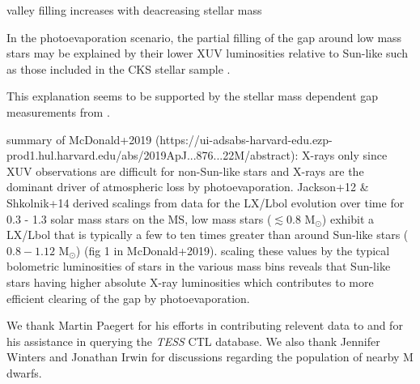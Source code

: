 \documentclass[twocolumn]{emulateapj}
\newcommand{\tess}[1]{\emph{TESS}#1}
\begin{document}
valley filling increases with deacreasing stellar mass  

In the photoevaporation scenario, the
partial filling of the gap around low mass stars may be explained by their lower XUV luminosities relative to 
Sun-like such as those included in the CKS stellar sample \citep{}.

This explanation seems to be supported by the stellar mass dependent gap measurements from \cite{fulton18}. 

summary of McDonald+2019 (https://ui-adsabs-harvard-edu.ezp-prod1.hul.harvard.edu/abs/2019ApJ...876...22M/abstract):
X-rays only since XUV observations are difficult for non-Sun-like stars and X-rays are the dominant driver of 
atmospheric loss by photoevaporation. 
Jackson+12 \& Shkolnik+14 derived scalings from data for the LX/Lbol evolution over time for 0.3 - 1.3 solar mass stars
on the MS, low mass stars ($\lesssim 0.8$ M$_{\odot}$) exhibit a LX/Lbol that is typically a few to ten times greater 
than around Sun-like stars ($0.8-1.12$ M$_{\odot}$) (fig 1 in McDonald+2019).
scaling these values by the typical bolometric luminosities of stars in the various mass bins reveals that 
Sun-like stars having higher absolute X-ray luminosities which contributes to more efficient clearing of the 
gap by photoevaporation.

\acknowledgements
We thank Martin Paegert for his efforts in contributing relevent data to and for his assistance in querying the \tess{}
CTL database. We also thank Jennifer Winters and Jonathan Irwin for discussions regarding the population of nearby
M dwarfs.




\end{document}
